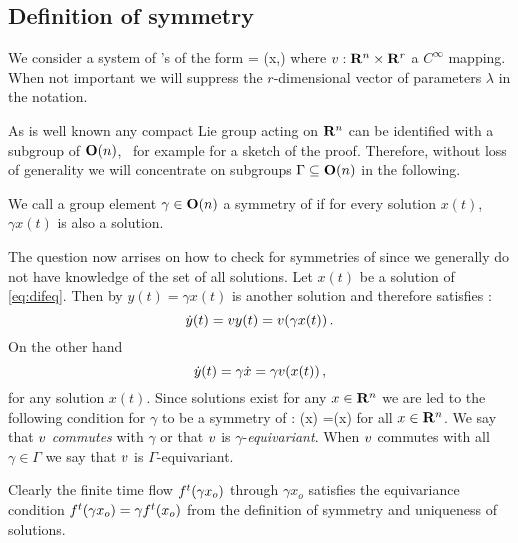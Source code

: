 \renewcommand{\inputfile}{\version\ - edited 2007-03-11 symODEs}

\subsection{Definition of symmetry}

We consider a system of \ode's of the form
\beq
	 = \vf(x,\lambda)
	\label{eq:difeq}
\eeq
where $v: \mathbf{R}^{n}\times\mathbf{R}^{r}$ a $C^\infty$ mapping. When
not important we will suppress the $r$-dimensional vector of parameters
$\lambda$ in the notation.

As is well known any compact Lie group acting on $\mathbf{R}^{n}$ can be identified
with a subgroup of $\mathbf{O}(n)$, \cf\ for example 
for a sketch of the proof. Therefore, without loss of generality
we will concentrate on subgroups $\Gamma\subseteq\mathbf{O}(n)$ in the following.

\begin{definition}
\label{def:symmetry}
We call a group element $\gamma\in\mathbf{O}(n)$ a symmetry of  if for every solution
$x(t)$, $\gamma x(t)$ is also a solution.
\end{definition}

The question now arrises on how to check for symmetries of  since
we generally do not have knowledge of the set of all solutions. Let $x(t)$ be a solution
of \ref{eq:difeq}. Then by  $y(t)=\gamma x(t)$ is another solution 
and therefore satisfies :
\[
 \dot{y}(t)=v{y(t)}=v(\gamma x(t))\,.
\]
On the other hand
\[
 \dot{y}(t)=\gamma \dot{x} = \gamma v(x(t))\,,
\]
for any solution $x(t)$. Since solutions exist for any $x\in\mathbf{R}^{n}$ we are led to the following 
condition for $\gamma$ to be a symmetry of :
\beq
	\vf(\gamma x) =\gamma \vf(x)
	\label{eq:equiv}
\eeq
for all $x\in\mathbf{R}^{n}$. We say that $v$ \emph{commutes} with $\gamma$ or that $v$ is $\gamma$-\emph{equivariant}.
When $v$ commutes with all $\gamma\in\Gamma$ we say that $v$ is $\Gamma$-equivariant.

Clearly the finite time flow ${f^{t}(\gamma x_o)}$ through $\gamma x_o$ 
satisfies the equivariance condition ${f^{t}(\gamma x_o)}=\gamma {f^{t}(x_o)}$ from 
the definition of symmetry and uniqueness of solutions.


